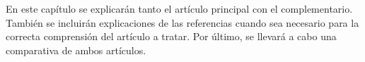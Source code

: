 \chapter{}
\label{articulos}

En este capítulo se explicarán tanto el artículo principal con el complementario. También se incluirán explicaciones de las referencias cuando sea necesario para la correcta comprensión del artículo a tratar. Por último, se llevará a cabo una comparativa de ambos artículos.



